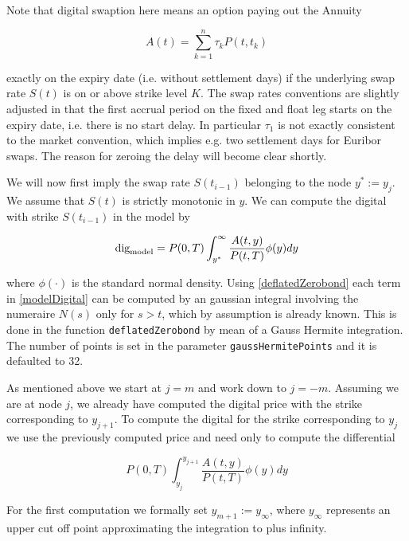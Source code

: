 \documentclass{amsart}
\theoremstyle{plain}
\numberwithin{equation}{section}
\begin{document}
Note that digital swaption here means an option paying out the Annuity

\begin{equation}
A(t) = \sum_{k=1}^n \tau_k P(t,t_k)
\end{equation}

exactly on the expiry date (i.e. without settlement days) if the underlying swap rate $S(t)$ is on or above strike level $K$. The swap rates conventions are slightly adjusted in that the first accrual period on the fixed and float leg starts on the expiry date, i.e. there is no start delay. In particular $\tau_1$ is not exactly consistent to the market convention, which implies e.g. two settlement days for Euribor swaps. The reason for zeroing the delay will become clear shortly.

We will now first imply the swap rate $S(t_{i-1})$ belonging to the node $y^*:=y_j$. We assume that $S(t)$ is strictly monotonic in $y$. We can compute the digital with strike $S(t_{i-1})$ in the model by

\begin{equation}\label{modelDigital}
\textnormal{dig}_{\textnormal{model}} = P(0,T) \int_{y^*}^{\infty} \frac{A(t,y)}{P(t,T)} \phi(y) dy
\end{equation} 

where $\phi(\cdot)$ is the standard normal density. Using \ref{deflatedZerobond} each term in \ref{modelDigital} can be computed by an gaussian integral involving the numeraire $N(s)$ only for $s>t$, which by assumption is already known. This is done in the function
\verb+deflatedZerobond+ by mean of a Gauss Hermite integration. The number of points is set in the parameter
\verb+gaussHermitePoints+ and it is defaulted to 32.

As mentioned above we start at $j=m$ and work down to $j=-m$. Assuming we are at node $j$, we already have computed the digital price
with the strike corresponding to $y_{j+1}$. To compute the digital for the strike corresponding to $y_{j}$ we use the previously computed
price and need only to compute the differential

\begin{equation}\label{differentialDigital}
P(0,T) \int_{y_{j}}^{y_{j+1}} \frac{A(t,y)}{P(t,T)} \phi(y) dy
\end{equation}

For the first computation we formally set $y_{m+1} := y_\infty$, where $y_\infty$ represents an upper cut off point approximating the
integration to plus infinity.
\end{document}
